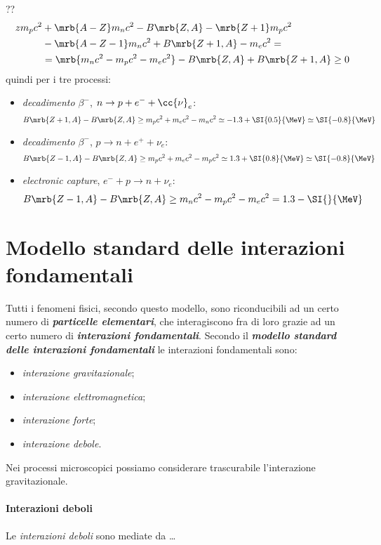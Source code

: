 ??
\begin{align*}
  z m_p c^2 & + \mrb{A-Z} m_n c^2 - B \mrb{Z,A} - \mrb{Z+1} m_p c^2
  \\
  & - \mrb{A - Z - 1} m_n c^2 + B \mrb{Z + 1, A} - m_e c^2 = 
  \\
  & = \mrb{m_n c^2 - m_p c^2 - m_e c^2} - B \mrb{Z,A} + B \mrb{Z+1, A} \geq 0
\end{align*}
quindi per i tre processi:

\begin{itemize}
  \item \textit{decadimento $\beta^-$}, $n \rightarrow p + e^- +
  \cc{\nu}_{e}$:
  \[
    B \mrb{Z+1, A} - B \mrb{Z,A} \geq m_p c^2 + m_e c^2 - m_n c^2 \simeq
     -1.3 + \SI{0.5}{\MeV} \simeq \SI{-0.8}{\MeV}
  \]

  \item \textit{decadimento $\beta^-$}, $p \rightarrow n + e^+ + \nu_e$:
  \[
    B \mrb{Z-1, A} - B \mrb{Z,A} \geq m_p c^2 + m_e c^2 - m_p c^2 \simeq
     1.3 + \SI{0.8}{\MeV} \simeq \SI{-0.8}{\MeV}
  \]

  \item \textit{electronic capture}, $e^- + p \rightarrow n + \nu_e$:
  \[
    B \mrb{Z-1, A} - B \mrb{Z,A} \geq m_n c^2 - m_p c^2 - m_e c^2 = 1.3 -
    \SI{}{\MeV} %
  \]
\end{itemize}

\section{Modello standard delle interazioni fondamentali}
Tutti i fenomeni fisici, secondo questo modello, sono riconducibili ad un certo
numero di \textit{\textbf{particelle elementari}}, che interagiscono fra di
loro grazie ad un certo numero di \textit{\textbf{interazioni fondamentali}}.
Secondo il \textit{\textbf{modello standard delle interazioni fondamentali}} le
interazioni fondamentali sono:
\begin{itemize}
  \item \textit{interazione gravitazionale};
  \item \textit{interazione elettromagnetica};
  \item \textit{interazione forte};
  \item \textit{interazione debole}.
\end{itemize}
Nei processi microscopici possiamo considerare trascurabile l'interazione
gravitazionale.

\paragraph{Interazioni deboli}
Le \textit{interazioni deboli} sono mediate da \dots %

